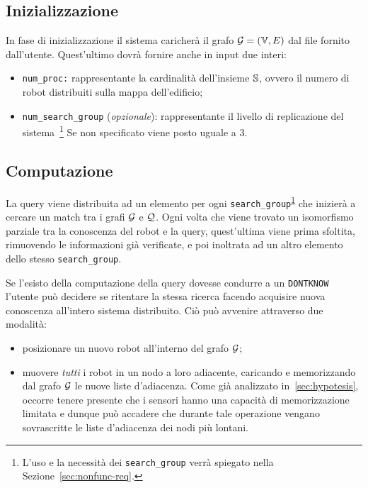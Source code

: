 \documentclass{llncs}
\begin{document}
\subsection{Inizializzazione}
In fase di inizializzazione il sistema caricherà il grafo $\mathcal{G} = ( \mathbb{V}, E)$ dal file
fornito dall'utente. Quest'ultimo dovrà fornire anche in input due interi:
\begin{itemize}
\item \texttt{num\_proc:} rappresentante la cardinalità dell'insieme $\mathbb{S}$, ovvero il numero di
robot distribuiti sulla mappa dell'edificio;
\item \texttt{num\_search\_group} (\emph{opzionale}): rappresentante
  il livello di replicazione del sistema~\footnote{\label{fn:searchgroup}
    L'uso e la necessità dei \texttt{search\_group} verrà spiegato
    nella Sezione~\ref*{sec:nonfunc-req}.} Se non specificato viene posto uguale a $3$.
\end{itemize}

\subsection{Computazione}
\label{sec:computation}
La query viene distribuita ad un elemento per ogni \texttt{search\_group}\textsuperscript{\ref{fn:searchgroup}}
che inizierà a cercare un match tra i grafi $\mathcal{G}$ e $\mathcal{Q}$. Ogni volta che viene trovato un isomorfismo
parziale tra la conoscenza del robot e la query, quest'ultima viene prima sfoltita, rimuovendo
le informazioni già verificate, e poi inoltrata ad
un altro elemento dello stesso \texttt{search\_group}.

Se l'esisto della computazione della query dovesse condurre a un \texttt{DONTKNOW}
l'utente può decidere se ritentare la stessa ricerca facendo acquisire nuova conoscenza
all'intero sistema distribuito. Ciò può avvenire attraverso due modalità:
\begin{itemize}
	\item posizionare un nuovo robot all'interno del grafo $\mathcal{G}$;
	\item muovere \emph{tutti} i robot in un nodo a loro adiacente, caricando e memorizzando
	  dal grafo $\mathcal{G}$ le nuove liste d'adiacenza.
          Come già analizzato in~\ref{sec:hypotesis},
          occorre tenere presente che i sensori hanno
	una capacità di memorizzazione limitata e dunque può accadere che durante
	tale operazione vengano sovrascritte le liste d'adiacenza dei nodi più lontani.
\end{itemize}
\end{document}
